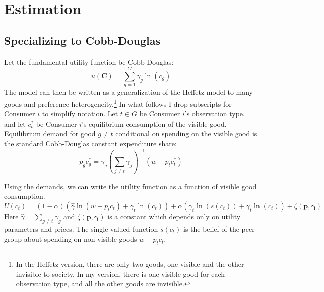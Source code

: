 \documentclass[12pt]{article}
\begin{document}
\section{Estimation}
\subsection{Specializing to Cobb-Douglas}

Let the fundamental utility function be Cobb-Douglas:
\[u(\mathbf{C}) = \sum_{g=1}^{G} \gamma_g \ln(c_g)\]
The model can then be written as a generalization of the Heffetz model to many goods and preference heterogeneity.\footnote{ In the Heffetz version, there are only two goods, one visible and the other invisible to society. In my version, there is one visible good for each observation type, and all the other goods are invisible.}
In what follows I drop subscripts for Consumer $i$ to simplify notation. Let $t \in G$ be Consumer $i$'s observation type, and let $c_{t}^*$ be Consumer $i$'s equilibrium consumption of the visible good.  Equilibrium demand for good $g\neq t$ conditional on spending on the visible good is the standard Cobb-Douglas constant expenditure share:
\[p_g c_g^* = \gamma_g\left(\sum_{j\neq t} \gamma_j\right)^{-1}\left(w-p_t c_t^* \right)\]

Using the demands, we can write the utility function as a function of visible good consumption.
\begin{equation}
    \label{eq:ufun}
    U(c_t) = (1-\alpha) \left(\hat{\gamma} \ln \left(w-p_t c_t\right) + \gamma_t \ln \left(c_t \right)\right) + \alpha \left(\gamma_t \ln \left(s(c_t)\right) + \gamma_t \ln \left(c_t\right) \right) + \zeta(\mathbf{p},\mathbf{\gamma})
\end{equation}
Here $\hat{\gamma} = \sum_{g\neq t} \gamma_g$ and $\zeta(\mathbf{p},\mathbf{\gamma})$ is a constant which depends only on utility parameters and prices.  The single-valued function $s(c_t)$ is the belief of the peer group about spending on non-visible goods $w-p_t c_t$. 
\end{document}
